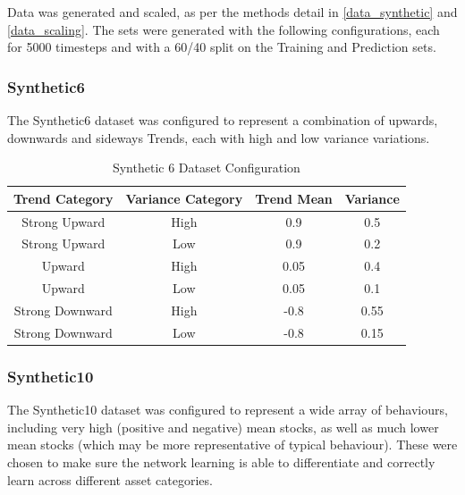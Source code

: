 \documentclass[a4paper,11pt,oneside]{article}
\theoremstyle{plain}
\theoremstyle{definition}
\begin{document}
Data was generated and scaled, as per the methods detail in \ref{data_synthetic} and \ref{data_scaling}. The sets were generated with the following configurations, each for 5000 timesteps and with a 60/40 split on the Training and Prediction sets.

\subsubsection{Synthetic6} \label{dataset_synthetic6}

The Synthetic6 dataset was configured to represent a combination of upwards, downwards and sideways Trends, each with high and low variance variations.

\begin{table}[h]
	\centering
	\begin{tabular}{|c|c|c|c|}
		\hline
		\textbf{Trend Category} &\textbf{Variance Category} & \textbf{Trend Mean} & \textbf{Variance}\\\hline	
		{Strong Upward} & {High} & {0.9} & {0.5} \\\hline
		{Strong Upward} & {Low} & {0.9} & {0.2} \\\hline
		{Upward} & {High} & {0.05} & {0.4} \\\hline
		{Upward} & {Low} & {0.05} & {0.1} \\\hline
		{Strong Downward} & {High} & {-0.8} & {0.55} \\\hline
		{Strong Downward} & {Low} & {-0.8} & {0.15} \\\hline
	\end{tabular}
	\newline\newline
	\caption{Synthetic 6 Dataset Configuration}\label{tab_synth6}
\end{table}

\subsubsection{Synthetic10}\label{dataset_synthetic10}

The Synthetic10 dataset was configured to represent a wide array of behaviours, including very high (positive and negative) mean stocks, as well as much lower mean stocks (which may be more representative of typical behaviour). These were chosen to make sure the network learning is able to differentiate and correctly learn across different asset categories.
\end{document}
